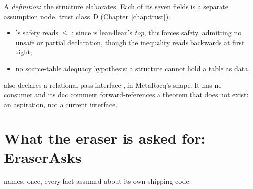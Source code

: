 \begin{remark}
 A \emph{definition}: the structure elaborates. Each of its seven fields is a
separate assumption node, trust class~D (Chapter~\ref{chap:trust}).
\begin{itemize}
\item {}'s safety reads  $\le$ ; since
 is lean4lean's \emph{top}, this forces safety, admitting no unsafe or partial
declaration, though the inequality reads backwards at first sight;
\item no source-table adequacy hypothesis: a  structure cannot hold a table as data.
\end{itemize}
\end{remark}

\begin{remark}
  also declares a relational pass interface , in
MetaRocq's  shape. It has no consumer and its doc comment forward-references
a theorem that does not exist: an aspiration, not a current interface.
\end{remark}

\section{What the eraser is asked for: EraserAsks}
\label{sec:eraser:asks}
 names, once, every fact assumed about its own shipping code.

